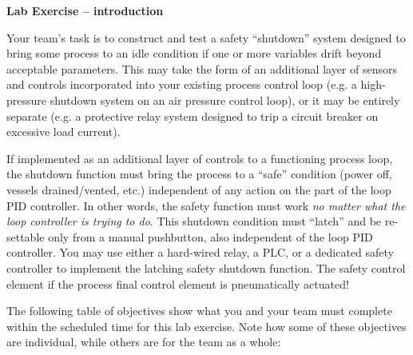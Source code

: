 

\noindent
{\bf Lab Exercise -- introduction}

\vskip 5pt

Your team's task is to construct and test a safety ``shutdown'' system designed to bring some process to an idle condition if one or more variables drift beyond acceptable parameters.  This may take the form of an additional layer of sensors and controls incorporated into your existing process control loop (e.g. a high-pressure shutdown system on an air pressure control loop), or it may be entirely separate (e.g. a protective relay system designed to trip a circuit breaker on excessive load current).

If implemented as an additional layer of controls to a functioning process loop, the shutdown function must bring the process to a ``safe'' condition (power off, vessels drained/vented, etc.) independent of any action on the part of the loop PID controller.  In other words, the safety function must work {\it no matter what the loop controller is trying to do}.  This shutdown condition must ``latch'' and be re-settable only from a manual pushbutton, also independent of the loop PID controller.  You may use either a hard-wired relay, a PLC, or a dedicated safety controller to implement the latching safety shutdown function.  The safety control element  if the process final control element is pneumatically actuated!

The following table of objectives show what you and your team must complete within the scheduled time for this lab exercise.  Note how some of these objectives are individual, while others are for the team as a whole:



